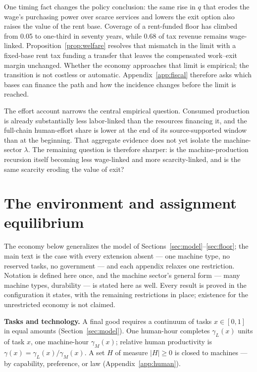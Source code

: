 \documentclass[12pt]{article}
\theoremstyle{plain}
\begin{document}
One timing fact changes the policy conclusion: the same rise in $q$ that erodes the wage's purchasing power over scarce services and lowers the exit option also raises the value of the rent base. Coverage of a rent-funded floor has climbed from 0.05 to one-third in seventy years, while 0.68 of tax revenue remains wage-linked. Proposition~\ref{prop:welfare} resolves that mismatch in the limit with a fixed-base rent tax funding a transfer that leaves the compensated work--exit margin unchanged. Whether the economy approaches that limit is empirical; the transition is not costless or automatic. Appendix~\ref{app:fiscal} therefore asks which bases can finance the path and how the incidence changes before the limit is reached.

The effort account narrows the central empirical question. Consumed production is already substantially less labor-linked than the resources financing it, and the full-chain human-effort share is lower at the end of its source-supported window than at the beginning. That aggregate evidence does not yet isolate the machine-sector $\lambda$. The remaining question is therefore sharper: is the machine-production recursion itself becoming less wage-linked and more scarcity-linked, and is the same scarcity eroding the value of exit?

\appendix
{}

\section{The environment and assignment equilibrium}\label{app:environment}

The economy below generalizes the model of Sections~\ref{sec:model}--\ref{sec:floor}; the main text is the case with every extension absent --- one machine type, no reserved tasks, no government --- and each appendix relaxes one restriction. Notation is defined here once, and the machine sector's general form --- many machine types, durability --- is stated here as well. Every result is proved in the configuration it states, with the remaining restrictions in place; existence for the unrestricted economy is not claimed.

\textbf{Tasks and technology.} A final good requires a continuum of tasks $x\in[0,1]$ in equal amounts (Section~\ref{sec:model}). One human-hour completes $\gamma _L(x)$ units of task $x$, one machine-hour $\gamma _M(x)$; relative human productivity is $\gamma (x) = \gamma _L(x)/\gamma _M(x)$. A set $H$ of measure $|H| \ge 0$ is closed to machines --- by capability, preference, or law (Appendix~\ref{app:human}).
\end{document}
